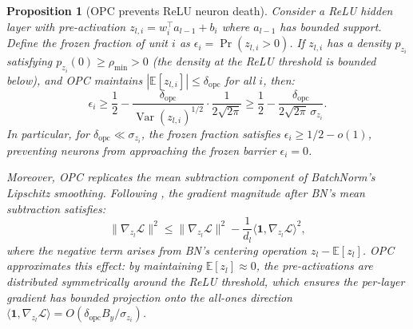 \documentclass{article}
\providecommand{\E}{\mathbb{E}}
\providecommand{\norm}[1]{\lVert #1 \rVert}
\DeclareMathOperator{\Var}{Var}
\theoremstyle{plain}
\newtheorem{proposition}{Proposition}
\theoremstyle{definition}
\theoremstyle{remark}
\begin{document}

\begin{proposition}[OPC prevents ReLU neuron death]
\label{prop:opc_neuron_death}
Consider a ReLU hidden layer with pre-activation $z_{l,i} = w_i^\top a_{l-1} + b_i$ where $a_{l-1}$ has bounded support. Define the \emph{frozen fraction} of unit $i$ as $\epsilon_i = \Pr(z_{l,i} > 0)$. If $z_{l,i}$ has a density $p_{z_i}$ satisfying $p_{z_i}(0) \geq \rho_{\min} > 0$ (the density at the ReLU threshold is bounded below), and OPC maintains $|\E[z_{l,i}]| \leq \delta_{\mathrm{opc}}$ for all $i$, then:
\begin{equation}
\label{eq:opc_frozen_bound}
    \epsilon_i \geq \frac{1}{2} - \frac{\delta_{\mathrm{opc}}}{\Var(z_{l,i})^{1/2}} \cdot \frac{1}{2\sqrt{2\pi}} \geq \frac{1}{2} - \frac{\delta_{\mathrm{opc}}}{2\sqrt{2\pi}\,\sigma_{z_i}}.
\end{equation}
In particular, for $\delta_{\mathrm{opc}} \ll \sigma_{z_i}$, the frozen fraction satisfies $\epsilon_i \geq 1/2 - o(1)$, preventing neurons from approaching the frozen barrier $\epsilon_i = 0$.

Moreover, OPC replicates the \emph{mean subtraction} component of BatchNorm's Lipschitz smoothing. Following \citet{santurkar2018does}, the gradient magnitude after BN's mean subtraction satisfies:
\begin{equation}
\label{eq:opc_lipschitz}
    \norm{\nabla_{z_l}\hat{\mathcal{L}}}^2 \leq \norm{\nabla_{z_l}\mathcal{L}}^2 - \frac{1}{d_l}\langle \mathbf{1}, \nabla_{z_l}\mathcal{L}\rangle^2,
\end{equation}
where the negative term arises from BN's centering operation $z_l - \E[z_l]$. OPC approximates this effect: by maintaining $\E[z_l] \approx 0$, the pre-activations are distributed symmetrically around the ReLU threshold, which ensures the per-layer gradient has bounded projection onto the all-ones direction $\langle \mathbf{1}, \nabla_{z_l}\mathcal{L}\rangle = O(\delta_{\mathrm{opc}} B_y / \sigma_{z_i})$.
\end{proposition}
\end{document}
